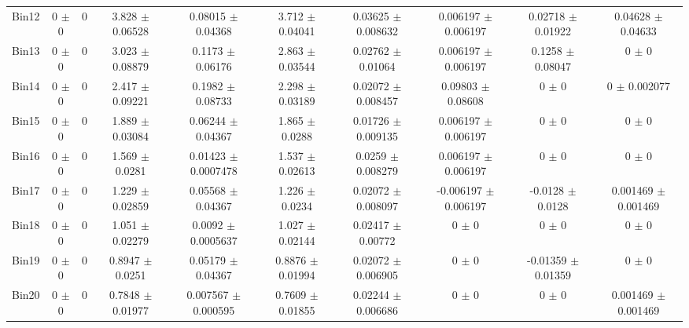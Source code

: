 \begin{tabular}{@{\extracolsep{4pt}}lccccccccc@{}}
     Bin12 & 0 $\pm$ 0 & 0 & 3.828 $\pm$ 0.06528 & 0.08015 $\pm$ 0.04368 & 3.712 $\pm$ 0.04041 & 0.03625 $\pm$ 0.008632 & 0.006197 $\pm$ 0.006197 & 0.02718 $\pm$ 0.01922 & 0.04628 $\pm$ 0.04633 \\ 
     Bin13 & 0 $\pm$ 0 & 0 & 3.023 $\pm$ 0.08879 & 0.1173 $\pm$ 0.06176 & 2.863 $\pm$ 0.03544 & 0.02762 $\pm$ 0.01064 & 0.006197 $\pm$ 0.006197 & 0.1258 $\pm$ 0.08047 & 0 $\pm$ 0 \\ 
     Bin14 & 0 $\pm$ 0 & 0 & 2.417 $\pm$ 0.09221 & 0.1982 $\pm$ 0.08733 & 2.298 $\pm$ 0.03189 & 0.02072 $\pm$ 0.008457 & 0.09803 $\pm$ 0.08608 & 0 $\pm$ 0 & 0 $\pm$ 0.002077 \\ 
     Bin15 & 0 $\pm$ 0 & 0 & 1.889 $\pm$ 0.03084 & 0.06244 $\pm$ 0.04367 & 1.865 $\pm$ 0.0288 & 0.01726 $\pm$ 0.009135 & 0.006197 $\pm$ 0.006197 & 0 $\pm$ 0 & 0 $\pm$ 0 \\ 
     Bin16 & 0 $\pm$ 0 & 0 & 1.569 $\pm$ 0.0281 & 0.01423 $\pm$ 0.0007478 & 1.537 $\pm$ 0.02613 & 0.0259 $\pm$ 0.008279 & 0.006197 $\pm$ 0.006197 & 0 $\pm$ 0 & 0 $\pm$ 0 \\ 
     Bin17 & 0 $\pm$ 0 & 0 & 1.229 $\pm$ 0.02859 & 0.05568 $\pm$ 0.04367 & 1.226 $\pm$ 0.0234 & 0.02072 $\pm$ 0.008097 & -0.006197 $\pm$ 0.006197 & -0.0128 $\pm$ 0.0128 & 0.001469 $\pm$ 0.001469 \\ 
     Bin18 & 0 $\pm$ 0 & 0 & 1.051 $\pm$ 0.02279 & 0.0092 $\pm$ 0.0005637 & 1.027 $\pm$ 0.02144 & 0.02417 $\pm$ 0.00772 & 0 $\pm$ 0 & 0 $\pm$ 0 & 0 $\pm$ 0 \\ 
     Bin19 & 0 $\pm$ 0 & 0 & 0.8947 $\pm$ 0.0251 & 0.05179 $\pm$ 0.04367 & 0.8876 $\pm$ 0.01994 & 0.02072 $\pm$ 0.006905 & 0 $\pm$ 0 & -0.01359 $\pm$ 0.01359 & 0 $\pm$ 0 \\ 
     Bin20 & 0 $\pm$ 0 & 0 & 0.7848 $\pm$ 0.01977 & 0.007567 $\pm$ 0.000595 & 0.7609 $\pm$ 0.01855 & 0.02244 $\pm$ 0.006686 & 0 $\pm$ 0 & 0 $\pm$ 0 & 0.001469 $\pm$ 0.001469 \\ 
\hline\hline
  \end{tabular}
